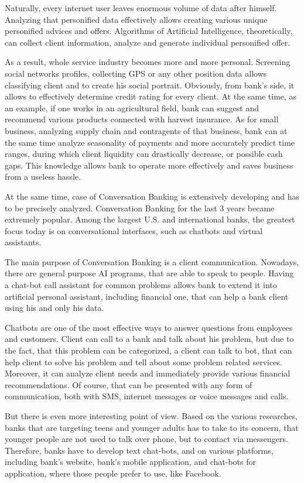 Naturally, every internet user leaves enormous volume of data after himself.
Analyzing that personified data effectively allows creating various unique personified advices and offers.
Algorithms of Artificial Intelligence, theoretically, can collect client information, analyze and generate individual personified offer.

As a result, whole service industry becomes more and more personal.
Screening social networks profiles, collecting GPS or any other position data allows classifying client and to create his social portrait.
Obviously, from bank's side, it allows to effectively determine credit rating for every client.
At the same time, as an example, if one works in an agricultural field, bank can suggest and recommend various products connected with harvest insurance.
As for small business, analyzing supply chain and contragents of that business, bank can at the same time analyze seasonality of payments and more accurately predict time ranges, during which client liquidity can drastically decrease, or possible cash gaps.
This knowledge allows bank to operate more effectively and saves business from a useless hassle.

At the same time, case of Conversation Banking is extensively developing and has to be precisely analyzed.
Conversation Banking for the last 3 years became extremely popular.
Among the largest U.S. and international banks, the greatest focus today is on conversational interfaces, such as chatbots and virtual assistants.
\cite{deloitte_thriving_in_ai_era}

The main purpose of Conversation Banking is a client communication.
Nowadays, there are general purpose AI programs, that are able to speak to people.
Having a chat-bot call assistant for common problems allows bank to extend it into artificial personal assistant, including financial one, that can help a bank client using his and only his data.

Chatbots are one of the most effective ways to answer questions from employees and customers.
Client can call to a bank and talk about his problem, but due to the fact, that this problem can be categorized, a client can talk to bot, that can help client to solve his problem and tell about some problem related services.
Moreover, it can analyze client needs and immediately provide various financial recommendations.
Of course, that can be presented with any form of communication, both with SMS, internet messages or voice messages and calls.

But there is even more interesting point of view.
Based on the various researches, banks that are targeting teens and younger adults has to take to its concern, that younger people are not used to talk over phone, but to contact via messengers. 
Therefore, banks have to develop text chat-bots, and on various platforms, including bank's website, bank's mobile application, and chat-bots for application, where those people prefer to use, like Facebook.

